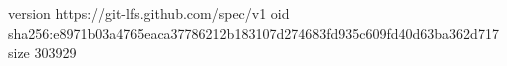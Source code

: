 version https://git-lfs.github.com/spec/v1
oid sha256:e8971b03a4765eaca37786212b183107d274683fd935c609fd40d63ba362d717
size 303929
